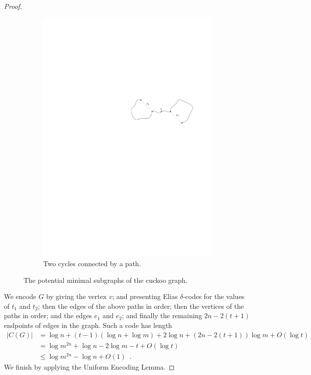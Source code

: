 \documentclass{patmorin}
\begin{document}
\begin{proof}
\begin{figure}
\begin{subfigure}[b]{0.6\textwidth}
      \includegraphics{cuckoo2}
      \caption{Two cycles connected by a path.}
    \end{subfigure}
    \caption{The potential minimal subgraphs of the cuckoo graph.}
  \end{figure}

  We encode $G$ by giving the vertex $v$; and presenting Elias
  $\delta$-codes for the values of $t_1$ and $t_2$; then the edges of
  the above paths in order; then the vertices of the paths in order;
  and the edges $e_1$ and $e_2$; and finally the remaining $2n - 2(t +
  1)$ endpoints of edges in the graph. Such a code has length
  \begin{align*}
    |C(G)| &= \log n + (t - 1)(\log n + \log m) + 2\log n + (2n - 2(t + 1))\log m + O(\log t) \\
           &= \log m^{2n} + \log n - 2\log m - t + O(\log t) \\
           &\leq \log m^{2n} - \log n + O(1) \enspace .
  \end{align*}
  We finish by applying the Uniform Encoding Lemma.
\end{proof}
\end{document}
